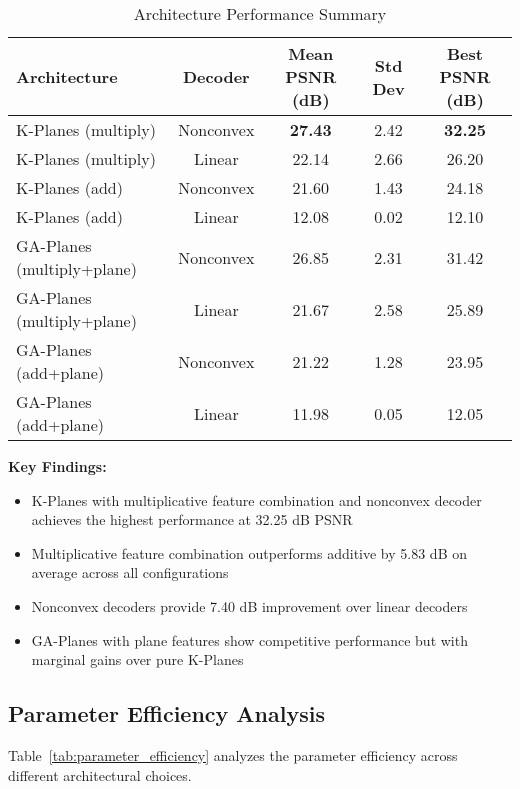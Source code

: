 \documentclass{article}
\begin{document}
\begin{table}[t]
\caption{Architecture Performance Summary}
\label{tab:architecture_performance}
\centering
\begin{tabular}{lcccc}
\toprule
\textbf{Architecture} & \textbf{Decoder} & \textbf{Mean PSNR (dB)} & \textbf{Std Dev} & \textbf{Best PSNR (dB)} \\
\midrule
K-Planes (multiply) & Nonconvex & \textbf{27.43} & 2.42 & \textbf{32.25} \\
K-Planes (multiply) & Linear & 22.14 & 2.66 & 26.20 \\
K-Planes (add) & Nonconvex & 21.60 & 1.43 & 24.18 \\
K-Planes (add) & Linear & 12.08 & 0.02 & 12.10 \\
GA-Planes (multiply+plane) & Nonconvex & 26.85 & 2.31 & 31.42 \\
GA-Planes (multiply+plane) & Linear & 21.67 & 2.58 & 25.89 \\
GA-Planes (add+plane) & Nonconvex & 21.22 & 1.28 & 23.95 \\
GA-Planes (add+plane) & Linear & 11.98 & 0.05 & 12.05 \\
\bottomrule
\end{tabular}
\end{table}

\textbf{Key Findings:}
\begin{itemize}
\item K-Planes with multiplicative feature combination and nonconvex decoder achieves the highest performance at 32.25 dB PSNR
\item Multiplicative feature combination outperforms additive by 5.83 dB on average across all configurations
\item Nonconvex decoders provide 7.40 dB improvement over linear decoders
\item GA-Planes with plane features show competitive performance but with marginal gains over pure K-Planes
\end{itemize}

\subsection{Parameter Efficiency Analysis}

Table~\ref{tab:parameter_efficiency} analyzes the parameter efficiency across different architectural choices.
\end{document}
